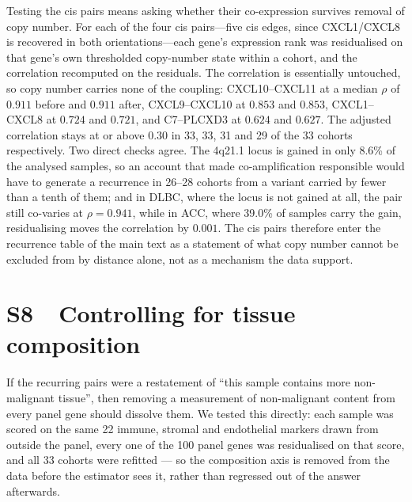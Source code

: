\documentclass[11pt]{article}
\begin{document}
Testing the cis pairs means asking whether their co-expression survives removal of copy number. For each of the four cis pairs---five cis edges, since CXCL1/CXCL8 is recovered in both orientations---each gene's expression rank was residualised on that gene's own thresholded copy-number state within a cohort, and the correlation recomputed on the residuals. The correlation is essentially untouched, so copy number carries none of the coupling: CXCL10--CXCL11 at a median $\rho$ of $0.911$ before and $0.911$ after, CXCL9--CXCL10 at $0.853$ and $0.853$, CXCL1--CXCL8 at $0.724$ and $0.721$, and C7--PLCXD3 at $0.624$ and $0.627$. The adjusted correlation stays at or above $0.30$ in 33, 33, 31 and 29 of the 33 cohorts respectively. Two direct checks agree. The 4q21.1 locus is gained in only 8.6\% of the analysed samples, so an account that made co-amplification responsible would have to generate a recurrence in 26--28 cohorts from a variant carried by fewer than a tenth of them; and in DLBC, where the locus is not gained at all, the pair still co-varies at $\rho = 0.941$, while in ACC, where 39.0\% of samples carry the gain, residualising moves the correlation by $0.001$. The cis pairs therefore enter the recurrence table of the main text as a statement of what copy number cannot be excluded from by distance alone, not as a mechanism the data support.

\section*{S8\ \ Controlling for tissue composition}

If the recurring pairs were a restatement of ``this sample contains more non-malignant tissue'', then removing a measurement of non-malignant content from every panel gene should dissolve them. We tested this directly: each sample was scored on the same 22 immune, stromal and endothelial markers drawn from outside the panel, every one of the 100 panel genes was residualised on that score, and all 33 cohorts were refitted --- so the composition axis is removed from the data before the estimator sees it, rather than regressed out of the answer afterwards.
\end{document}
